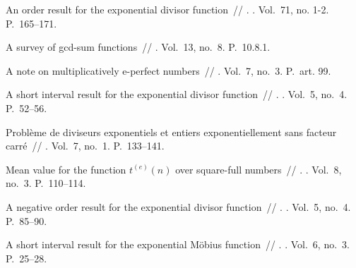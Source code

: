 \documentclass[12pt,a4paper]{article}
\begin{document}
\begin{thebibliography}{10}
 An order result for the exponential divisor function~//
  . \BibDash
{}. \BibDash
\newblock Vol.~71, no. 1-2. \BibDash
\newblock P.~165--171.

 A survey of gcd-sum functions~// 
  \BibDash
{}. \BibDash
\newblock Vol.~13, no.~8. \BibDash
\newblock P.~10.8.1.

 A note on multiplicatively e-perfect
  numbers~//  \BibDash
{}. \BibDash
\newblock Vol.~7, no.~3. \BibDash
\newblock P.~art. 99.

 A short interval result for the exponential divisor
  function~// . \BibDash
{}. \BibDash
\newblock Vol.~5, no.~4. \BibDash
\newblock P.~52--56.

 Problème de diviseurs exponentiels et entiers
  exponentiellement sans facteur carré~//
  \href{http://dx.doi.org/10.5802/jtnb.136}{} \BibDash
{}. \BibDash
\newblock Vol.~7, no.~1. \BibDash
\newblock P.~133--141.

 Mean value for the function $t^{(e)}(n)$
  over square-full numbers~// . \BibDash
{}. \BibDash
\newblock Vol.~8, no.~3. \BibDash
\newblock P.~110--114.

 A negative order result for the exponential divisor
  function~// . \BibDash
{}. \BibDash
\newblock Vol.~5, no.~4. \BibDash
\newblock P.~85--90.

 A short interval result for the exponential Möbius
  function~// . \BibDash
{}. \BibDash
\newblock Vol.~6, no.~3. \BibDash
\newblock P.~25--28.

\end{thebibliography}
\end{document}
